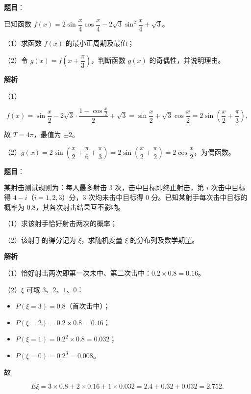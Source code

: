\begin{answer}

\textbf{题目}：

已知函数 $f(x)=2\sin\dfrac x4\cos\dfrac x4-2\sqrt3\sin^2\dfrac x4+\sqrt3$。

（1）求函数 $f(x)$ 的最小正周期及最值；

（2）令 $g(x)=f\left(x+\dfrac{\pi}3\right)$，判断函数 $g(x)$ 的奇偶性，并说明理由。

\textbf{解析}

（1）

\nopagebreak[4]
\[f(x)=\sin\frac x2-2\sqrt3\cdot\frac{1-\cos\frac x2}2+\sqrt3=\sin\frac x2+\sqrt3\cos\frac x2=2\sin\left(\frac x2+\frac{\pi}3\right),\]

故 $T=4\pi$，最值为 $\pm2$。

（2）$g(x)=2\sin\left(\dfrac x2+\dfrac{\pi}6+\dfrac{\pi}3\right)=2\sin\left(\dfrac x2+\dfrac{\pi}2\right)=2\cos\dfrac x2$，为偶函数。


\end{answer}
\begin{answer}

\textbf{题目}：

某射击测试规则为：每人最多射击 $3$ 次，击中目标即终止射击，第 $i$ 次击中目标得 $4-i$（$i=1,2,3$）分，$3$ 次均未击中目标得 $0$ 分。已知某射手每次击中目标的概率为 $0.8$，其各次射击结果互不影响。

（1）求该射手恰好射击两次的概率；

（2）该射手的得分记为 $\xi$，求随机变量 $\xi$ 的分布列及数学期望。

\textbf{解析}

（1）恰好射击两次即第一次未中、第二次击中：$0.2\times0.8=0.16$。

（2）$\xi$ 可取 $3$、$2$、$1$、$0$：

\begin{itemize}
\item $P(\xi=3)=0.8$（首次击中）；
\item $P(\xi=2)=0.2\times0.8=0.16$；
\item $P(\xi=1)=0.2^2\times0.8=0.032$；
\item $P(\xi=0)=0.2^3=0.008$。
\end{itemize}

故

\nopagebreak[4]
\[E\xi=3\times0.8+2\times0.16+1\times0.032=2.4+0.32+0.032=2.752.\]


\end{answer}
